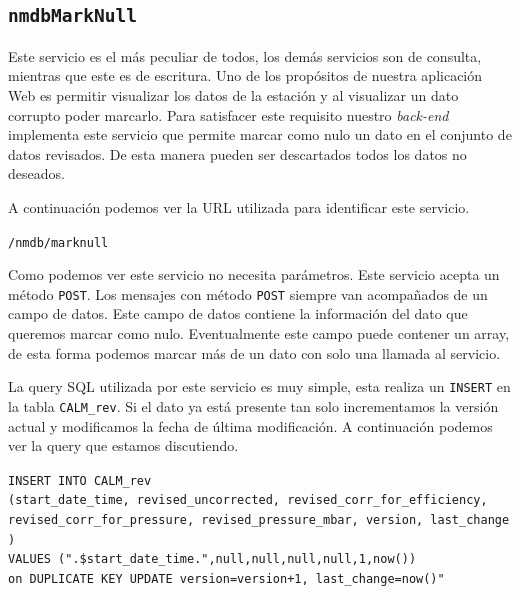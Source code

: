 {	\subsection{\texttt{nmdbMarkNull}}
		Este servicio es el más peculiar de todos, los demás servicios son de consulta, mientras que este es de escritura. Uno de los
		propósitos de nuestra aplicación Web es permitir visualizar los datos de la estación y al visualizar un dato corrupto poder marcarlo.
		Para satisfacer este requisito nuestro \emph{back-end} implementa este servicio que permite marcar como nulo un dato en el conjunto de
		datos revisados. De esta manera pueden ser descartados todos los datos no deseados.
		\par
		A continuación podemos ver la URL utilizada para identificar este servicio.
			\begin{center} \texttt{/nmdb/marknull}  \end{center}
		Como podemos ver este servicio no necesita parámetros. Este servicio acepta un método \texttt{POST}. Los mensajes con método
		\texttt{POST} siempre van acompañados de un campo de datos. Este campo de datos contiene la información del dato que queremos marcar
		como nulo. Eventualmente este campo puede contener un array, de esta forma podemos marcar más de un dato con solo una llamada al
		servicio.
		\par 
		La query SQL utilizada por este servicio es muy simple, esta realiza un \texttt{INSERT} en la tabla \texttt{CALM\_rev}. Si el dato ya
		está presente tan solo incrementamos la versión actual y modificamos la fecha de última modificación. A continuación podemos ver la
		query que estamos discutiendo.
			\begin{center} \texttt{\textquotedbl INSERT INTO CALM\_rev 
			  		\\	(start\_date\_time, revised\_uncorrected, revised\_corr\_for\_efficiency, revised\_corr\_for\_pressure, revised\_pressure\_mbar, version, last\_change )
				      	\\	VALUES (\cc".\$start\_date\_time."\cc,null,null,null,null,1,now()) 
				      	\\	on DUPLICATE KEY UPDATE version=version+1, last\_change=now()"}
			\end{center} 
}
